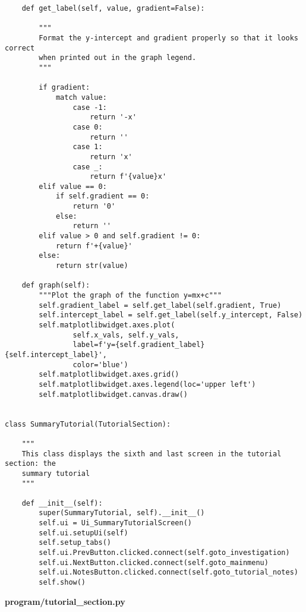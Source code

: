 \documentclass{article}
\begin{document}
\begin{lstlisting}
    def get_label(self, value, gradient=False):

        """
        Format the y-intercept and gradient properly so that it looks correct
        when printed out in the graph legend.
        """

        if gradient:
            match value:
                case -1:
                    return '-x'
                case 0:
                    return ''
                case 1:
                    return 'x'
                case _:
                    return f'{value}x'
        elif value == 0:
            if self.gradient == 0:
                return '0'
            else:
                return ''
        elif value > 0 and self.gradient != 0:
            return f'+{value}'
        else:
            return str(value)

    def graph(self):
        """Plot the graph of the function y=mx+c"""
        self.gradient_label = self.get_label(self.gradient, True)
        self.intercept_label = self.get_label(self.y_intercept, False)
        self.matplotlibwidget.axes.plot(
                self.x_vals, self.y_vals,
                label=f'y={self.gradient_label}{self.intercept_label}',
                color='blue')
        self.matplotlibwidget.axes.grid()
        self.matplotlibwidget.axes.legend(loc='upper left')
        self.matplotlibwidget.canvas.draw()


class SummaryTutorial(TutorialSection):

    """
    This class displays the sixth and last screen in the tutorial section: the
    summary tutorial
    """

    def __init__(self):
        super(SummaryTutorial, self).__init__()
        self.ui = Ui_SummaryTutorialScreen()
        self.ui.setupUi(self)
        self.setup_tabs()
        self.ui.PrevButton.clicked.connect(self.goto_investigation)
        self.ui.NextButton.clicked.connect(self.goto_mainmenu)
        self.ui.NotesButton.clicked.connect(self.goto_tutorial_notes)
        self.show()
\end{lstlisting}


\textbf{program/tutorial\_section.py}
\end{document}
